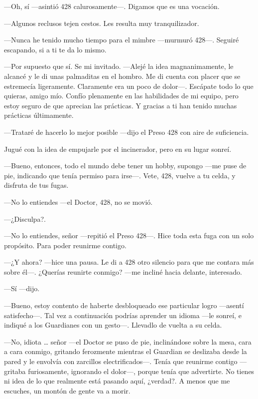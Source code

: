 ---Oh, sí ---asintió 428 calurosamente---. Digamos que es una vocación.

---Algunos reclusos tejen cestos. Les resulta muy tranquilizador.

---Nunca he tenido mucho tiempo para el mimbre ---murmuró 428---.
Seguiré escapando, si a ti te da lo mismo.

---Por supuesto que sí. Se mi invitado. ---Alejé la idea magnanimamente,
le alcancé y le di unas palmaditas en el hombro. Me di cuenta con placer
que se estremecía ligeramente. Claramente era un poco de dolor---.
Escápate todo lo que quieras, amigo mío. Confío plenamente en las
habilidades de mi equipo, pero estoy seguro de que aprecian las
prácticas. Y gracias a ti han tenido muchas prácticas últimamente.

---Trataré de hacerlo lo mejor posible ---dijo el Preso 428 con aire de
suficiencia.

Jugué con la idea de empujarle por el incinerador, pero en su lugar
sonreí.

---Bueno, entonces, todo el mundo debe tener un hobby, supongo ---me
puse de pie, indicando que tenía permiso para irse---. Vete, 428, vuelve
a tu celda, y disfruta de tus fugas.

---No lo entiendes ---el Doctor, 428, no se movió.

---¿Disculpa?.

---No lo entiendes, señor ---repitió el Preso 428---. Hice toda esta
fuga con un solo propósito. Para poder reunirme contigo.

---¿Y ahora? ---hice una pausa. Le di a 428 otro silencio para que me
contara más sobre él---. ¿Querías reunirte conmigo? ---me incliné hacia
delante, interesado.

---Sí ---dijo.

---Bueno, estoy contento de haberte desbloqueado ese particular logro
---asentí satisfecho---. Tal vez a continuación podrías aprender un
idioma ---le sonreí, e indiqué a los Guardianes con un gesto---.
Llevadlo de vuelta a su celda.

---No, idiota \ldots{} señor ---el Doctor se puso de pie, inclinándose
sobre la mesa, cara a cara conmigo, gritando ferozmente mientras el
Guardian se deslizaba desde la pared y le envolvía con zarcillos
electrificados---. Tenía que reunirme contigo ---gritaba furiosamente,
ignorando el dolor---, porque tenía que advertirte. No tienes ni idea de
lo que realmente está pasando aquí, ¿verdad?. A menos que me escuches,
un montón de gente va a morir.